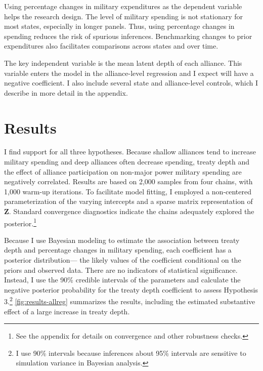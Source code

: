 \documentclass[12pt]{article}
\begin{document}
Using percentage changes in military expenditures as the dependent variable helps the research design. 
The level of military spending is not stationary for most states, especially in longer panels. 
Thus, using percentage changes in spending reduces the risk of spurious inferences.
Benchmarking changes to prior expenditures also facilitates comparisons across states and over time. 


The key independent variable is the mean latent depth of each alliance. 
This variable enters the model in the alliance-level regression and I expect will have a negative coefficient. 
I also include several state and alliance-level controls, which I describe in more detail in the appendix. 

 

\section{Results}


I find support for all three hypotheses. 
Because shallow alliances tend to increase military spending and deep alliances often decrease spending, treaty depth and the effect of alliance participation on non-major power military spending are negatively correlated. 
Results are based on 2,000 samples from four chains, with 1,000 warm-up iterations. 
To facilitate model fitting, I employed a non-centered parameterization of the varying intercepts and a sparse matrix representation of \textbf{Z}. 
Standard convergence diagnostics indicate the chains adequately explored the posterior.\footnote{See the appendix for details on convergence and other robustness checks.} 


Because I use Bayesian modeling to estimate the association between treaty depth and percentage changes in military spending, each coefficient has a posterior distribution--- the likely values of the coefficient conditional on the priors and observed data.
There are no indicators of statistical significance. 
Instead, I use the 90\% credible intervals of the parameters and calculate the negative posterior probability for the treaty depth coefficient to assess Hypothesis 3.\footnote{I use 90\% intervals because inferences about 95\% intervals are sensitive to simulation variance in Bayesian analysis.}
\autoref{fig:results-allreg} summarizes the results, including the estimated substantive effect of a large increase in treaty depth. 
\end{document}

